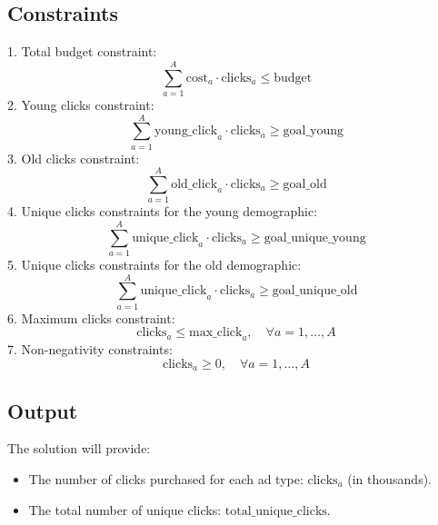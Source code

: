 \documentclass{article}
\begin{document}
\subsection*{Constraints}
1. Total budget constraint:
\[
\sum_{a=1}^{A} \text{cost}_{a} \cdot \text{clicks}_a \leq \text{budget}
\]
2. Young clicks constraint:
\[
\sum_{a=1}^{A} \text{young\_click}_{a} \cdot \text{clicks}_a \geq \text{goal\_young}
\]
3. Old clicks constraint:
\[
\sum_{a=1}^{A} \text{old\_click}_{a} \cdot \text{clicks}_a \geq \text{goal\_old}
\]
4. Unique clicks constraints for the young demographic:
\[
\sum_{a=1}^{A} \text{unique\_click}_{a} \cdot \text{clicks}_a \geq \text{goal\_unique\_young}
\]
5. Unique clicks constraints for the old demographic:
\[
\sum_{a=1}^{A} \text{unique\_click}_{a} \cdot \text{clicks}_a \geq \text{goal\_unique\_old}
\]
6. Maximum clicks constraint:
\[
\text{clicks}_{a} \leq \text{max\_click}_{a}, \quad \forall a = 1, \ldots, A
\]
7. Non-negativity constraints:
\[
\text{clicks}_{a} \geq 0, \quad \forall a = 1, \ldots, A
\]

\subsection*{Output}
The solution will provide:
\begin{itemize}
    \item The number of clicks purchased for each ad type: \( \text{clicks}_{a} \) (in thousands).
    \item The total number of unique clicks: \( \text{total\_unique\_clicks} \).
\end{itemize}
\end{document}
